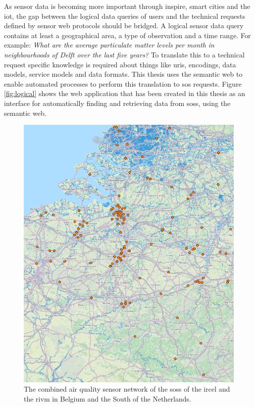 As sensor data is becoming more important through \ac{inspire}, smart cities and the \ac{iot}, the gap between the logical data queries of users and the technical requests defined by sensor web protocols should be bridged. A logical sensor data query contains at least a geographical area, a type of observation and a time range. For example: \textit{What are the average particulate matter levels per month in neighbourhoods of Delft over the last five years?} To translate this to a technical request specific knowledge is required about things like \acp{uri}, encodings, data models, service models and data formats. This thesis uses the semantic web to enable automated processes to perform this translation to \ac{sos} requests. Figure \ref{fig:logical} shows the web application that has been created in this thesis as an interface for automatically finding and retrieving data from \aclp{sos}, using the semantic web. 

\begin{figure}
	\centering
	\includegraphics[width=\linewidth]{figs/combined.png}
	\caption{The combined air quality sensor network of the \aclp*{sos} of the \acf*{ircel} and the \acf*{rivm} in Belgium and the South of the Netherlands.}
	\label{fig:combined}
\end{figure}

